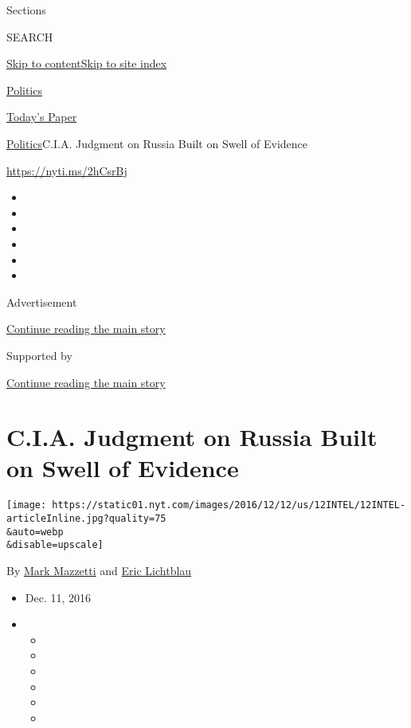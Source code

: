 Sections

SEARCH

\protect\hyperlink{site-content}{Skip to
content}\protect\hyperlink{site-index}{Skip to site index}

\href{https://www.nytimes.com/section/politics}{Politics}

\href{https://myaccount.nytimes.com/auth/login?response_type=cookie\&client_id=vi}{}

\href{https://www.nytimes.com/section/todayspaper}{Today's Paper}

\href{/section/politics}{Politics}\textbar{}C.I.A. Judgment on Russia
Built on Swell of Evidence

\url{https://nyti.ms/2hCsrBj}

\begin{itemize}
\item
\item
\item
\item
\item
\item
\end{itemize}

Advertisement

\protect\hyperlink{after-top}{Continue reading the main story}

Supported by

\protect\hyperlink{after-sponsor}{Continue reading the main story}

\hypertarget{cia-judgment-on-russia-built-on-swell-of-evidence}{%
\section{C.I.A. Judgment on Russia Built on Swell of
Evidence}\label{cia-judgment-on-russia-built-on-swell-of-evidence}}

\texttt{[image: https://static01.nyt.com/images/2016/12/12/us/12INTEL/12INTEL-articleInline.jpg?quality=75\\\&auto=webp\\\&disable=upscale]}

By \href{http://www.nytimes.com/by/mark-mazzetti}{Mark Mazzetti} and
\href{http://www.nytimes.com/by/eric-lichtblau}{Eric Lichtblau}

\begin{itemize}
\item
  Dec. 11, 2016
\item
  \begin{itemize}
  \item
  \item
  \item
  \item
  \item
  \item
  \end{itemize}
\end{itemize}

